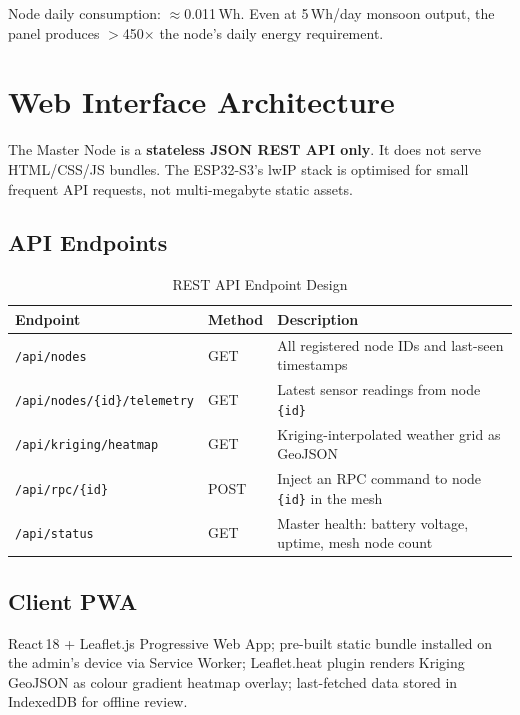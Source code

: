 \documentclass[12pt,a4paper]{article}
\begin{document}
Node daily consumption: $\approx$0.011\,Wh. Even at 5\,Wh/day monsoon output, the panel produces $>$450$\times$ the node's daily energy requirement.

\section{Web Interface Architecture}

The Master Node is a \textbf{stateless JSON REST API only}. It does not serve HTML/CSS/JS bundles. The ESP32-S3's lwIP stack is optimised for small frequent API requests, not multi-megabyte static assets.

\subsection{API Endpoints}

\begin{table}[h!]
\centering
\caption{REST API Endpoint Design}
\begin{tabular}{L{5cm} C{1.5cm} L{7cm}}
\toprule
\textbf{Endpoint} & \textbf{Method} & \textbf{Description} \\
\midrule
\texttt{/api/nodes} & GET & All registered node IDs and last-seen timestamps \\
\texttt{/api/nodes/\{id\}/telemetry} & GET & Latest sensor readings from node \texttt{\{id\}} \\
\texttt{/api/kriging/heatmap} & GET & Kriging-interpolated weather grid as GeoJSON \\
\texttt{/api/rpc/\{id\}} & POST & Inject an RPC command to node \texttt{\{id\}} in the mesh \\
\texttt{/api/status} & GET & Master health: battery voltage, uptime, mesh node count \\
\bottomrule
\end{tabular}
\end{table}

\subsection{Client PWA}

React\,18 + Leaflet.js Progressive Web App; pre-built static bundle installed on the admin's device via Service Worker; Leaflet.heat plugin renders Kriging GeoJSON as colour gradient heatmap overlay; last-fetched data stored in IndexedDB for offline review.
\end{document}
